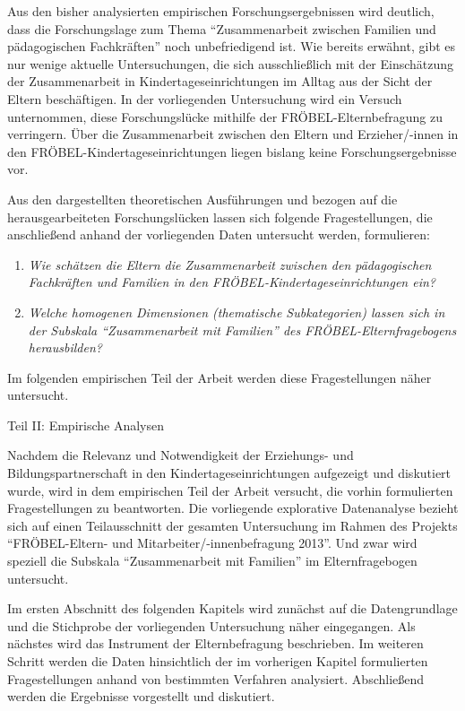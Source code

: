 \documentclass[12pt,a4paper]{article}
\begin{document}
Aus den bisher analysierten empirischen Forschungsergebnissen wird deutlich, dass die Forschungslage zum Thema "`Zusammenarbeit zwischen Familien und pädagogischen Fachkräften"' noch unbefriedigend ist. Wie bereits erwähnt, gibt es nur wenige aktuelle Untersuchungen, die sich ausschließlich mit der Ein\-schät\-zung der Zusammenarbeit in Kindertageseinrichtungen im Alltag aus der Sicht der Eltern beschäftigen. In der vorliegenden Untersuchung wird ein Versuch unternommen, diese Forschungslücke mithilfe der FRÖBEL-Elternbefragung zu verringern. Über die Zusammenarbeit zwischen den Eltern und Erzieher/-innen in den FRÖBEL-Kindertageseinrichtungen liegen bislang keine Forschungsergebnisse vor.

	Aus den dargestellten theoretischen Ausführungen und bezogen auf die herausgearbeiteten Forschungslücken lassen sich folgende Fragestellungen, die anschließend anhand der vorliegenden Daten untersucht werden, formulieren:
\begin{enumerate}

\item \textit{ Wie schätzen die Eltern die Zusammenarbeit zwischen den pädagogischen Fachkräften und Familien in den FRÖBEL-Kindertageseinrichtungen ein?}

\item \textit{Welche homogenen Dimensionen (thematische Subkategorien) lassen sich in der Subskala "`Zusammenarbeit mit Familien"' des FRÖBEL-Eltern\-frage\-bogens herausbilden?}
\end{enumerate}
Im folgenden empirischen Teil der Arbeit werden diese Fragestellungen näher untersucht.

\pagebreak
\vspace*{\fill}
\begin{Huge}
Teil II: Empirische Analysen
\end{Huge}
\vspace*{\fill}
\pagebreak


Nachdem die Relevanz und Notwendigkeit der Erziehungs- und Bildungspartnerschaft in den Kindertageseinrichtungen aufgezeigt und diskutiert wurde, wird in dem empirischen Teil der Arbeit versucht, die vorhin formulierten Fragestellungen zu beantworten. Die vorliegende explorative Datenanalyse bezieht sich auf einen Teilausschnitt der gesamten Untersuchung im Rahmen des Projekts "`FRÖBEL-Eltern- und Mitarbeiter/-innenbefragung 2013"'. Und zwar   wird speziell die Subskala "`Zusammenarbeit mit Familien"' im Elternfragebogen untersucht.

	Im ersten Abschnitt des folgenden Kapitels wird zunächst auf die Datengrundlage und die Stichprobe der vorliegenden Untersuchung näher eingegangen. Als nächstes wird das Instrument der Elternbefragung beschrieben. Im weiteren Schritt werden die Daten hinsichtlich der im vorherigen Kapitel formulierten Fragestellungen anhand von bestimmten Verfahren analysiert. Abschließend werden die Ergebnisse vorgestellt und diskutiert.
 
\end{document}
